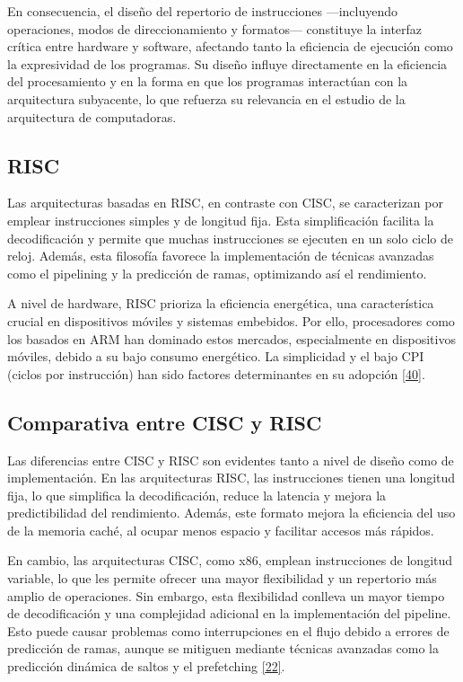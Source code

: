 \documentclass[12pt,oneside]{templates/unerthesis}
\begin{document}
En consecuencia, el diseño del repertorio de instrucciones ---incluyendo operaciones, modos de direccionamiento y formatos--- constituye la interfaz crítica entre hardware y software, afectando tanto la eficiencia de ejecución como la expresividad de los programas. Su diseño influye directamente en la eficiencia del procesamiento y en la forma en que los programas interactúan con la arquitectura subyacente, lo que refuerza su relevancia en el estudio de la arquitectura de computadoras.

\hypertarget{RISC}{%
\subsection{RISC}\label{RISC}}

Las arquitecturas basadas en RISC, en contraste con CISC, se caracterizan por emplear instrucciones simples y de longitud fija. Esta simplificación facilita la decodificación y permite que muchas instrucciones se ejecuten en un solo ciclo de reloj. Además, esta filosofía favorece la implementación de técnicas avanzadas como el pipelining y la predicción de ramas, optimizando así el rendimiento.

A nivel de hardware, RISC prioriza la eficiencia energética, una característica crucial en dispositivos móviles y sistemas embebidos. Por ello, procesadores como los basados en ARM han dominado estos mercados, especialmente en dispositivos móviles, debido a su bajo consumo energético. La simplicidad y el bajo CPI (ciclos por instrucción) han sido factores determinantes en su adopción \protect\hyperlink{ref-hennessy2017computer_riscv}{{[}40{]}}.

\hypertarget{comparativa-entre-cisc-y-risc}{%
\subsection{Comparativa entre CISC y RISC}\label{comparativa-entre-cisc-y-risc}}

Las diferencias entre CISC y RISC son evidentes tanto a nivel de diseño como de implementación. En las arquitecturas RISC, las instrucciones tienen una longitud fija, lo que simplifica la decodificación, reduce la latencia y mejora la predictibilidad del rendimiento. Además, este formato mejora la eficiencia del uso de la memoria caché, al ocupar menos espacio y facilitar accesos más rápidos.

En cambio, las arquitecturas CISC, como x86, emplean instrucciones de longitud variable, lo que les permite ofrecer una mayor flexibilidad y un repertorio más amplio de operaciones. Sin embargo, esta flexibilidad conlleva un mayor tiempo de decodificación y una complejidad adicional en la implementación del pipeline. Esto puede causar problemas como interrupciones en el flujo debido a errores de predicción de ramas, aunque se mitiguen mediante técnicas avanzadas como la predicción dinámica de saltos y el prefetching \protect\hyperlink{ref-tanenbaum_structured_2016}{{[}22{]}}.
\end{document}
